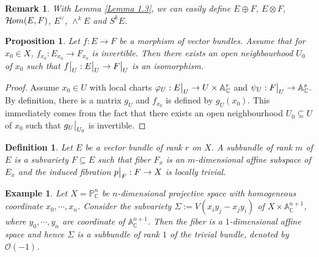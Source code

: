 \documentclass{ctexart}
\newtheorem{definition}{Definition}[section]
\newtheorem{remark}{Remark}[section]
\newtheorem{proposition}{Proposition}[section]
\newtheorem{example}{Example}[section]
\newcommand{\sheafhom}{\mathcal{H}\kern -.5pt om}
\begin{document}
\begin{remark}
    With Lemma \ref{Lemma 1.3}, we can easily define $E \oplus F$, $E \otimes F$, $\sheafhom(E, F)$, $E^{\vee}$, $\wedge^{k} E$ and $S^{k} E$.
\end{remark}
\begin{proposition}
    Let $f: E \rightarrow F$ be a morphism of vector bundles.
    Assume that for $x_{0}\in X$, $f_{x_{0}}: E_{x_{0}} \rightarrow F_{x_{0}}$ is invertible.
    Then there exists an open neighbourhood $U_{0}$ of $x_{0}$ such that $f\big{|}_{U}: E\big{|}_{U} \rightarrow F\big{|}_{U}$ is an isomorphism.
    \label{Proposition 1.5}
\end{proposition}
\begin{proof}
    Assume $x_{0}\in U$ with local charts $\varphi_{U}: E\big{|}_{U} \rightarrow U \times \mathbb{A}_{\mathbb{C}}^{r}$ and $\psi_{U}: F\big{|}_{U} \rightarrow \mathbb{A}_{\mathbb{C}}^{s}$.
    By definition, there is a matrix $g_{U}$ and $f_{x_{0}}$ is defined by $g_{U}(x_{0})$.
    This immediately comes from the fact that there exists an open neighbourhood $U_{0} \subseteq U$ of $x_{0}$ such that $g_{U}\big{|}_{U_{0}}$ is invertible.
\end{proof}
\begin{definition}
    Let $E$ be a vector bundle of rank $r$ on $X$.
    A subbundle of rank $m$ of $E$ is a subvariety $F \subseteq E$ such that fiber $F_{x}$ is an $m$-dimensional affine subspace of $E_{x}$ and the induced fibration $p\big{|}_{F}: F \rightarrow X$ is locally trivial.
\end{definition}
\begin{example}
    Let $X = \mathbb{P}_{\mathbb{C}}^{n}$ be $n$-dimensional projective space with homogeneous coordinate $x_{0}, \cdots, x_{n}$.
    Consider the subvariety $\Sigma := V(x_{i}y_{j} - x_{j}y_{i})$ of $X \times \mathbb{A}_{\mathbb{C}}^{n + 1}$,
    where $y_{0}, \cdots, y_{n}$ are coordinate of $\mathbb{A}_{\mathbb{C}}^{n + 1}$.
    Then the fiber is a $1$-dimensional affine space and hence $\Sigma$ is a subbundle of rank $1$ of the trivial bundle, denoted by $\mathcal{O}(-1)$.
\end{example}
\end{document}
